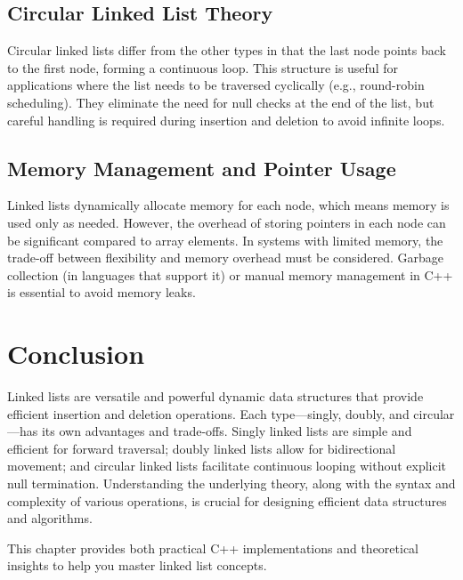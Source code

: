 \subsection{Circular Linked List Theory}
Circular linked lists differ from the other types in that the last node points back to the first node, forming a continuous loop. This structure is useful for applications where the list needs to be traversed cyclically (e.g., round-robin scheduling). They eliminate the need for null checks at the end of the list, but careful handling is required during insertion and deletion to avoid infinite loops.

\subsection{Memory Management and Pointer Usage}
Linked lists dynamically allocate memory for each node, which means memory is used only as needed. However, the overhead of storing pointers in each node can be significant compared to array elements. In systems with limited memory, the trade-off between flexibility and memory overhead must be considered. Garbage collection (in languages that support it) or manual memory management in C++ is essential to avoid memory leaks.

\section{Conclusion}
Linked lists are versatile and powerful dynamic data structures that provide efficient insertion and deletion operations. Each type—singly, doubly, and circular—has its own advantages and trade-offs. Singly linked lists are simple and efficient for forward traversal; doubly linked lists allow for bidirectional movement; and circular linked lists facilitate continuous looping without explicit null termination. Understanding the underlying theory, along with the syntax and complexity of various operations, is crucial for designing efficient data structures and algorithms.

\vspace{1em}
This chapter provides both practical C++ implementations and theoretical insights to help you master linked list concepts.
